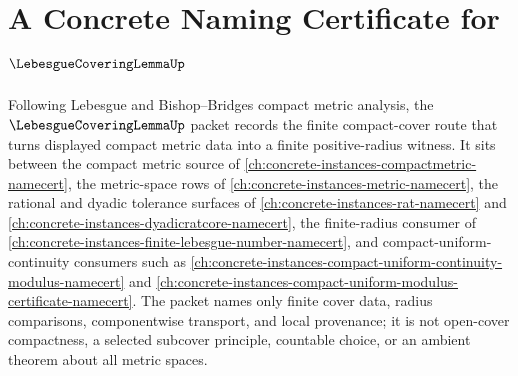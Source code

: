 \chapter{A Concrete Naming Certificate for $\LebesgueCoveringLemmaUp$}
\label{ch:concrete-instances-lebesgue-covering-lemma-namecert}

Following Lebesgue and Bishop--Bridges compact metric analysis, the $\LebesgueCoveringLemmaUp$ packet records the finite compact-cover route that turns displayed compact metric data into a finite positive-radius witness. It sits between the compact metric source of \autoref{ch:concrete-instances-compactmetric-namecert}, the metric-space rows of \autoref{ch:concrete-instances-metric-namecert}, the rational and dyadic tolerance surfaces of \autoref{ch:concrete-instances-rat-namecert} and \autoref{ch:concrete-instances-dyadicratcore-namecert}, the finite-radius consumer of \autoref{ch:concrete-instances-finite-lebesgue-number-namecert}, and compact-uniform-continuity consumers such as \autoref{ch:concrete-instances-compact-uniform-continuity-modulus-namecert} and \autoref{ch:concrete-instances-compact-uniform-modulus-certificate-namecert}. The packet names only finite cover data, radius comparisons, componentwise transport, and local provenance; it is not open-cover compactness, a selected subcover principle, countable choice, or an ambient theorem about all metric spaces.

